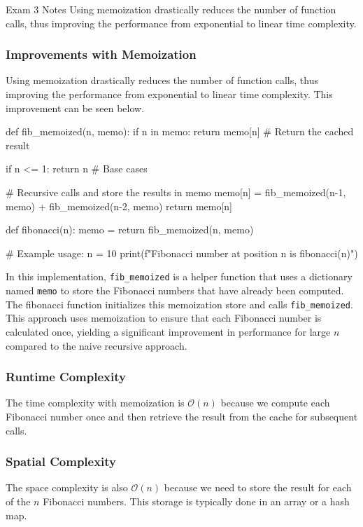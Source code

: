 \begin{examnotes}{Exam 3 Notes}
    Using memoization drastically reduces the number of function calls, thus improving the performance from exponential to linear time complexity.

    \begin{highlight}
        \subsubsection*{Improvements with Memoization}

        Using memoization drastically reduces the number of function calls, thus improving the performance from exponential to linear time complexity. This improvement can be seen below.

    \begin{code}[Python]
    def fib_memoized(n, memo):
        if n in memo:
            return memo[n]  # Return the cached result
        
        if n <= 1:
            return n  # Base cases
    
        # Recursive calls and store the results in memo
        memo[n] = fib_memoized(n-1, memo) + fib_memoized(n-2, memo)
        return memo[n]
    
    def fibonacci(n):
        memo = {}
        return fib_memoized(n, memo)
    
    # Example usage:
    n = 10
    print(f"Fibonacci number at position {n} is {fibonacci(n)}")    
    \end{code}
        In this implementation, \texttt{fib\_memoized} is a helper function that uses a dictionary named \texttt{memo} to store the Fibonacci numbers that have already been computed. The fibonacci 
        function initializes this memoization store and calls \texttt{fib\_memoized}. This approach uses memoization to ensure that each Fibonacci number is calculated once, yielding a significant 
        improvement in performance for large $n$ compared to the naive recursive approach. \vspace*{1em}

        \subsubsection*{Runtime Complexity}

        The time complexity with memoization is $\mathcal{O}(n)$ because we compute each Fibonacci number once and then retrieve the result from the cache for subsequent calls. \vspace*{1em}

        \subsubsection*{Spatial Complexity}

        The space complexity is also $\mathcal{O}(n)$ because we need to store the result for each of the $n$ Fibonacci numbers. This storage is typically done in an array or a hash map.
    \end{highlight}
\end{examnotes}

